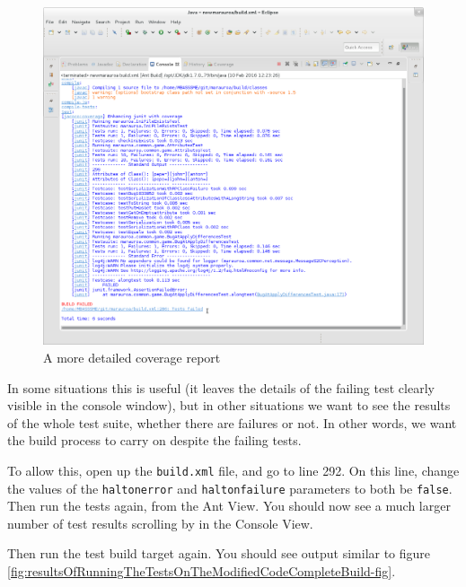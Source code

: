 \documentclass[
]{book}
\begin{document}
\begin{figure}

{\centering \includegraphics[width=1\linewidth]{images/3.4.2resultsOfRunningTheTestsOnTheModifiedCode} 

}

\caption{A more detailed coverage report}\label{fig:resultsOfRunningTheTestsOnTheModifiedCode-fig}
\end{figure}

In some situations this is useful (it leaves the details of the failing test clearly visible in the console window), but in other situations we want to see the results of the whole test suite, whether there are failures or not. In other words, we want the build process to carry on despite the failing tests.

To allow this, open up the \texttt{build.xml} file, and go to line 292. On this line, change the values of the \texttt{haltonerror} and \texttt{haltonfailure} parameters to both be \texttt{false}. Then run the tests again, from the Ant View. You should now see a much larger number of test results scrolling by in the Console View.

Then run the test build target again. You should see output similar to figure \ref{fig:resultsOfRunningTheTestsOnTheModifiedCodeCompleteBuild-fig}.
\end{document}
